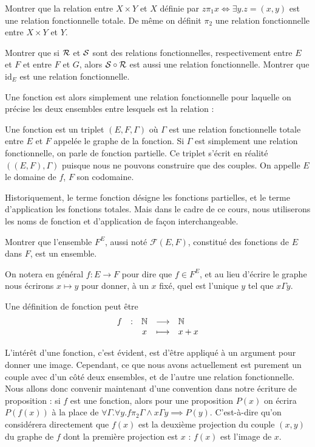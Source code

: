 \begin{exo}
    Montrer que la relation entre $X\times Y$ et $X$ définie par $z\pi_1 x\iff \exists y. z=(x,y)$ est une relation fonctionnelle totale. De même on définit $\pi_2$ une relation fonctionnelle entre $X\times Y$ et $Y$.
\end{exo}

\begin{exo}
    Montrer que si $\mathcal R$ et $\mathcal S$ sont des relations fonctionnelles, respectivement entre $E$ et $F$ et entre $F$ et $G$, alors $\mathcal S\circ \mathcal R$ est aussi une relation fonctionnelle. Montrer que $\mathrm{id}_E$ est une relation fonctionnelle.
\end{exo}

Une fonction est alors simplement une relation fonctionnelle pour laquelle on précise les deux ensembles entre lesquels est la relation :

\begin{defi}[Fonction]
    Une fonction est un triplet $(E,F,\Gamma)$ où $\Gamma$ est une relation fonctionnelle totale entre $E$ et $F$ appelée le graphe de la fonction. Si $\Gamma$ est simplement une relation fonctionnelle, on parle de fonction partielle. Ce triplet s'écrit en réalité $((E,F),\Gamma)$ puisque nous ne pouvons construire que des couples. On appelle $E$ le domaine de $f$, $F$ son codomaine.
\end{defi}

\begin{rmk}
    Historiquement, le terme fonction désigne les fonctions partielles, et le terme d'application les fonctions totales. Mais dans le cadre de ce cours, nous utiliserons les noms de fonction et d'application de façon interchangeable.
\end{rmk}

\begin{exo}
    Montrer que l'ensemble $F^E$, aussi noté $\mathcal F(E,F)$, constitué des fonctions de $E$ dans $F$, est un ensemble.
\end{exo}

On notera en général $f : E \to F$ pour dire que $f\in F^E$, et au lieu d'écrire le graphe nous écrirons $x\mapsto y$ pour donner, à un $x$ fixé, quel est l'unique $y$ tel que $x\Gamma y$.

\begin{expl}
    Une définition de fonction peut être $$\begin{array}{rcccl} f & : & \mathbb{N} &\longrightarrow & \mathbb{N}\\ & &x & \longmapsto & x+x\end{array}$$
\end{expl}

L'intérêt d'une fonction, c'est évident, est d'être appliqué à un argument pour donner une image. Cependant, ce que nous avons actuellement est purement un couple avec d'un côté deux ensembles, et de l'autre une relation fonctionnelle. Nous allons donc convenir maintenant d'une convention dans notre écriture de proposition : si $f$ est une fonction, alors pour une proposition $P(x)$ on écrira $P(f(x))$ à la place de $\forall \Gamma.\forall y.f\pi_2 \Gamma\land x\Gamma y \implies P(y)$. C'est-à-dire qu'on considérera directement que $f(x)$ est la deuxième projection du couple $(x,y)$ du graphe de $f$ dont la première projection est $x$ : $f(x)$ est l'image de $x$.

